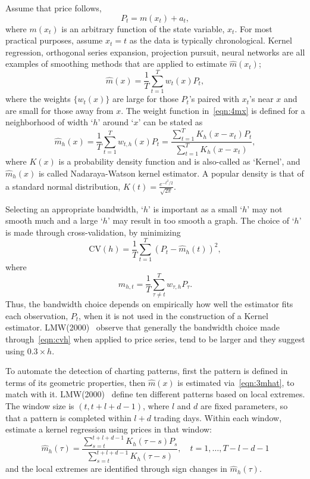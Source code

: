 Assume that price follows,
	\begin{equation} \label{eqn:4pt}
	P_{t} = m(x_{t}) + a_{t},
	\end{equation}
where $m(x_{t})$ is an arbitrary function of the state variable, $x_{t}$. For most practical purposes, assume $x_{t}= t$ as the data is typically chronological. Kernel regression, orthogonal series expansion, projection pursuit, neural networks are all examples of smoothing methods that are applied to estimate $\hat{m}(x_{t})$;
	\begin{equation} \label{eqn:4mx}
	\hat{m}(x) = \frac{1}{T} \sum_{t=1}^Tw_{t}(x)P_{t},
	\end{equation}
where the weights $\{w_{t}(x)\}$ are large for those $P_{t}$'s paired with $x_{t}$'s near $x$ and are small for those away from $x$. The weight function in~\eqref{eqn:4mx} is defined for a neighborhood of width `$h$'  around `$x$' can be stated as
	\begin{equation} \label{eqn:3mhat}
	\hat{m}_{h}(x) = \frac{1}{T}\sum_{t=1}^T w_{t,h}(x)P_{t} = \dfrac{\sum_{t=1}^T K_{h}(x-x_{t})P_{t}}{\sum_{t=1}^T K_{h}(x-x_{t})},
	\end{equation}
where $K(x)$ is a probability density function and is also-called as `Kernel', and $\hat{m}_{h}(x)$ is called Nadaraya-Watson kernel estimator. A popular density is that of a standard normal distribution, $K(t)=\frac{e^{-t^2/2}}{\sqrt{2\pi}}$.


Selecting an appropriate bandwidth, `$h$' is important as a small `$h$' may not smooth much and a large `$h$' may result in too smooth a graph. The choice of `$h$' is made through cross-validation, by minimizing
	\begin{equation} \label{eqn:cvh}
	\text{CV}(h) = \frac{1}{T}\sum_{t=1}^T (P_{t} - \hat{m}_{h}(t))^2,
	\end{equation}
where
	\begin{equation} \label{eqn:mht}
	\hat{m}_{h,t} = \frac{1}{T}\sum_{\tau\not=t}^T w_{\tau,h}P_{\tau}.
	\end{equation}
Thus, the bandwidth choice depends on empirically how well the estimator fits each observation, $P_{t}$, when it is not used in the construction of a Kernel estimator. LMW(2000)~\cite{LoMWang} observe that generally the bandwidth choice made through~\eqref{eqn:cvh} when applied to price series, tend to be larger and they suggest using $0.3 \times h$.


To automate the detection of charting patterns, first the pattern is defined in terms of its geometric properties, then $\hat{m}(x)$ is estimated via~\eqref{eqn:3mhat}, to match with it. LMW(2000)~\cite{LoMWang} define ten different patterns based on local extremes. The window size is $(t,t+l+d-1)$, where $l$ and $d$ are fixed parameters, so that a pattern is completed within $l+d$ trading days. Within each window, estimate  a kernel regression using prices in that window:
	\begin{equation} \label{eqn:longhat}
	\hat{m}_{h}(\tau) = \dfrac{\sum_{s = t}^{t+l+d-1}K_{h}(\tau - s)P_{s}}{\sum_{s = t}^{t+l+d-1}K_{h}(\tau - s)}, \quad t = 1,\ldots , T-l-d-1
	\end{equation}
and the local extremes are identified through sign changes in $\hat{m}_{h}(\tau)$.


